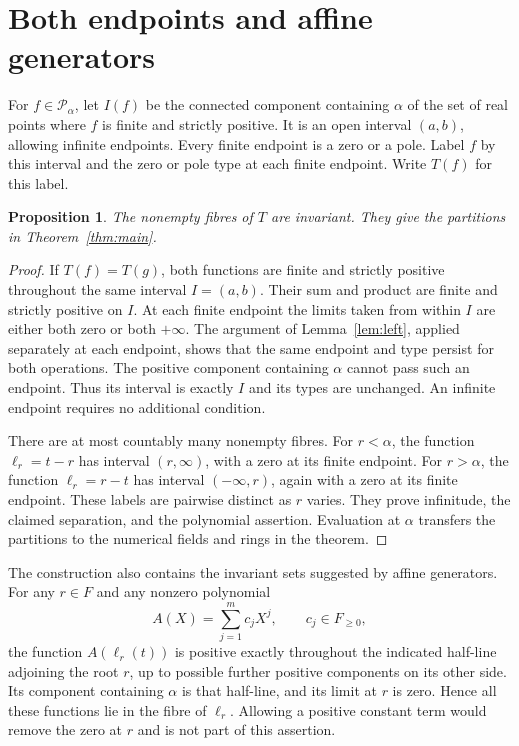 \documentclass[11pt]{article}
\newtheorem{proposition}[theorem]{Proposition}
\theoremstyle{remark}
\begin{document}
\section{Both endpoints and affine generators}
For $f\in\mathcal P_\alpha$, let $I(f)$ be the connected component containing $\alpha$ of the set of real points where $f$ is finite and strictly positive. It is an open interval $(a,b)$, allowing infinite endpoints. Every finite endpoint is a zero or a pole. Label $f$ by this interval and the zero or pole type at each finite endpoint. Write $T(f)$ for this label.

\begin{proposition}\label{prop:both}
The nonempty fibres of $T$ are invariant. They give the partitions in Theorem~\ref{thm:main}.
\end{proposition}
\begin{proof}
If $T(f)=T(g)$, both functions are finite and strictly positive throughout the same interval $I=(a,b)$. Their sum and product are finite and strictly positive on $I$. At each finite endpoint the limits taken from within $I$ are either both zero or both $+\infty$. The argument of Lemma~\ref{lem:left}, applied separately at each endpoint, shows that the same endpoint and type persist for both operations. The positive component containing $\alpha$ cannot pass such an endpoint. Thus its interval is exactly $I$ and its types are unchanged. An infinite endpoint requires no additional condition.

There are at most countably many nonempty fibres. For $r<\alpha$, the function $\ell_r=t-r$ has interval $(r,\infty)$, with a zero at its finite endpoint. For $r>\alpha$, the function $\ell_r=r-t$ has interval $(-\infty,r)$, again with a zero at its finite endpoint. These labels are pairwise distinct as $r$ varies. They prove infinitude, the claimed separation, and the polynomial assertion. Evaluation at $\alpha$ transfers the partitions to the numerical fields and rings in the theorem.
\end{proof}

The construction also contains the invariant sets suggested by affine generators. For any $r\in F$ and any nonzero polynomial
\[
 A(X)=\sum_{j=1}^m c_jX^j,\qquad c_j\in F_{\geq0},
\]
the function $A(\ell_r(t))$ is positive exactly throughout the indicated half-line adjoining the root $r$, up to possible further positive components on its other side. Its component containing $\alpha$ is that half-line, and its limit at $r$ is zero. Hence all these functions lie in the fibre of $\ell_r$. Allowing a positive constant term would remove the zero at $r$ and is not part of this assertion.
\end{document}
